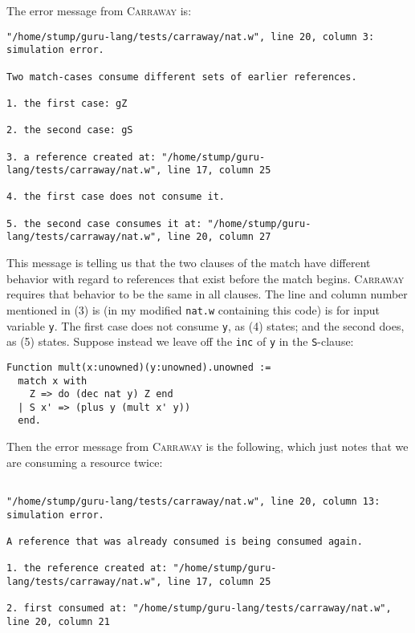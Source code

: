 \documentclass{book}[12pt]
\newcommand{\carraway}[0]{\textsc{Carraway}\xspace}
\begin{document}
\noindent The error message from \carraway is:

{\small
\begin{verbatim}
"/home/stump/guru-lang/tests/carraway/nat.w", line 20, column 3: simulation error.

Two match-cases consume different sets of earlier references.

1. the first case: gZ

2. the second case: gS

3. a reference created at: "/home/stump/guru-lang/tests/carraway/nat.w", line 17, column 25

4. the first case does not consume it.

5. the second case consumes it at: "/home/stump/guru-lang/tests/carraway/nat.w", line 20, column 27
\end{verbatim}
}

\noindent This message is telling us that the two clauses of the match
have different behavior with regard to references that exist before
the match begins.  \carraway requires that behavior to be the same in
all clauses.  The line and column number mentioned in (3) is (in my
modified \texttt{nat.w} containing this code) is for input variable
\texttt{y}.  The first case does not consume \texttt{y}, as (4)
states; and the second does, as (5) states.  Suppose instead we leave
off the \texttt{inc} of \texttt{y} in the \texttt{S}-clause:

\begin{verbatim}
Function mult(x:unowned)(y:unowned).unowned :=
  match x with
    Z => do (dec nat y) Z end
  | S x' => (plus y (mult x' y))
  end.
\end{verbatim}

\noindent Then the error message from \carraway is the following, which just notes that
we are consuming a resource twice:

{\small
\begin{verbatim}

"/home/stump/guru-lang/tests/carraway/nat.w", line 20, column 13: simulation error.

A reference that was already consumed is being consumed again.

1. the reference created at: "/home/stump/guru-lang/tests/carraway/nat.w", line 17, column 25

2. first consumed at: "/home/stump/guru-lang/tests/carraway/nat.w", line 20, column 21
\end{verbatim}
}
\end{document}

